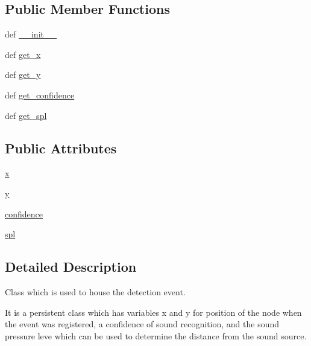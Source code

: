 \subsection*{Public Member Functions}
\begin{DoxyCompactItemize}
\item 
def \hyperlink{classlocaudio_1_1detectionevent_1_1DetectionEvent_aa998c7524a9484b5a3a7f80d4eba2280}{\-\_\-\-\_\-init\-\_\-\-\_\-}
\item 
def \hyperlink{classlocaudio_1_1detectionevent_1_1DetectionEvent_a220bfcacc5815c88912fe5fdc7b7a41c}{get\-\_\-x}
\item 
def \hyperlink{classlocaudio_1_1detectionevent_1_1DetectionEvent_a33b86d111b0979e20894dd7035aafb15}{get\-\_\-y}
\item 
def \hyperlink{classlocaudio_1_1detectionevent_1_1DetectionEvent_ae0e6b0c991471cfaf025d09c8730b45e}{get\-\_\-confidence}
\item 
def \hyperlink{classlocaudio_1_1detectionevent_1_1DetectionEvent_aa71a820d885f97dfb7aad1e32921cc75}{get\-\_\-spl}
\end{DoxyCompactItemize}
\subsection*{Public Attributes}
\begin{DoxyCompactItemize}
\item 
\hyperlink{classlocaudio_1_1detectionevent_1_1DetectionEvent_ae36950069a6f55e1f6e0251dbe80b0d4}{x}
\item 
\hyperlink{classlocaudio_1_1detectionevent_1_1DetectionEvent_aab867d871d3ab2bc608936ab64051b56}{y}
\item 
\hyperlink{classlocaudio_1_1detectionevent_1_1DetectionEvent_af0b955e105202f670cee964ce52d911f}{confidence}
\item 
\hyperlink{classlocaudio_1_1detectionevent_1_1DetectionEvent_aba6f9b944aea803742ef4aed6e34f215}{spl}
\end{DoxyCompactItemize}


\subsection{Detailed Description}
Class which is used to house the detection event. 

It is a persistent class which has variables x and y for position of the node when the event was registered, a confidence of sound recognition, and the sound pressure leve which can be used to determine the distance from the sound source. 

